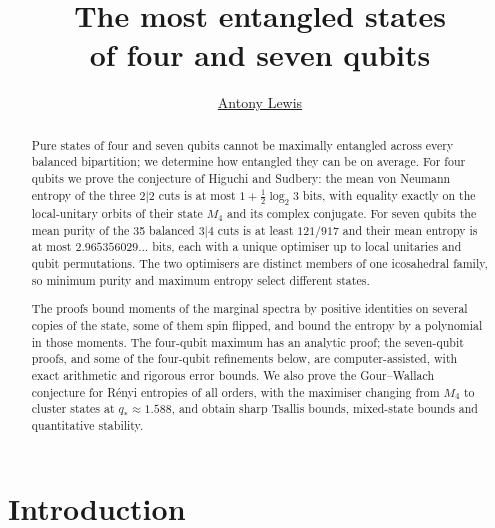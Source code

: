 \documentclass[11pt]{article}
\title{The most entangled states\\of four and seven qubits}
\author{\href{https://orcid.org/0000-0001-5927-6667}{Antony Lewis} \affiliation{\Sussex}}
\date{}
\begin{document}
\maketitle
\begin{abstract}
Pure states of four and seven qubits cannot be maximally entangled across every balanced bipartition; we determine
how entangled they can be on average. For four qubits we prove the conjecture of Higuchi and Sudbery: the mean von
Neumann entropy of the three $2|2$ cuts is at most $1+\tfrac12\log_2 3$ bits, with equality exactly on the
local-unitary orbits of their state $M_4$ and its complex conjugate. For seven qubits the mean purity of the 35
balanced $3|4$ cuts is at least $121/917$ and their mean entropy is at most $2.965356029\ldots$ bits, each with a
unique optimiser up to local unitaries and qubit permutations. The two optimisers are distinct members of one
icosahedral family, so minimum purity and maximum entropy select different states.

The proofs bound moments of the marginal spectra by positive identities on several copies of the state, some of them
spin flipped, and bound the entropy by a polynomial in those moments. The four-qubit maximum has an analytic proof; the
seven-qubit proofs, and some of the four-qubit refinements below, are computer-assisted, with exact arithmetic and
rigorous error bounds. We also prove the
Gour--Wallach conjecture for R\'enyi entropies of all orders, with the maximiser changing from $M_4$ to cluster
states at $q_*\approx1.588$, and obtain sharp Tsallis bounds, mixed-state bounds and quantitative stability.

\end{abstract}

\section{Introduction}\label{sec:fqe-intro}
\end{document}
